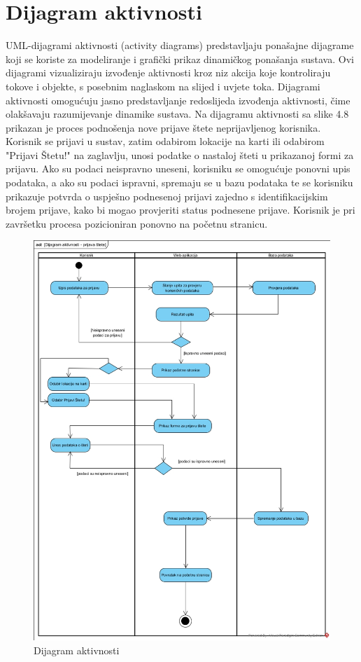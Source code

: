 \eject

\section{Dijagram aktivnosti}

UML-dijagrami aktivnosti (activity diagrams) predstavljaju ponašajne dijagrame koji se koriste za modeliranje i grafički prikaz dinamičkog ponašanja sustava.
Ovi dijagrami vizualiziraju izvođenje aktivnosti kroz niz akcija koje kontroliraju tokove i objekte, s posebnim naglaskom na slijed i uvjete toka.
Dijagrami aktivnosti omogućuju jasno predstavljanje redoslijeda izvođenja aktivnosti, čime olakšavaju razumijevanje dinamike sustava.
Na dijagramu aktivnosti sa slike 4.8 prikazan je proces podnošenja nove prijave štete neprijavljenog korisnika.
Korisnik se prijavi u sustav, zatim odabirom lokacije na karti ili odabirom "Prijavi Štetu!" na zaglavlju, unosi podatke o nastaloj šteti u prikazanoj formi za prijavu.
Ako su podaci neispravno uneseni, korisniku se omogućuje ponovni upis podataka, a ako su podaci ispravni, spremaju se u bazu podataka te se korisniku prikazuje potvrda o uspješno podnesenoj prijavi zajedno s identifikacijskim brojem prijave, kako bi mogao provjeriti status podnesene prijave. Korisnik je pri završetku procesa pozicioniran ponovno na početnu stranicu.

\begin{figure}[H]
	\includegraphics[scale=0.5]{slike/DA.jpg} %
	\centering
	\caption{Dijagram aktivnosti}
	\label{fig:DijagramAktivnosti}
\end{figure}


